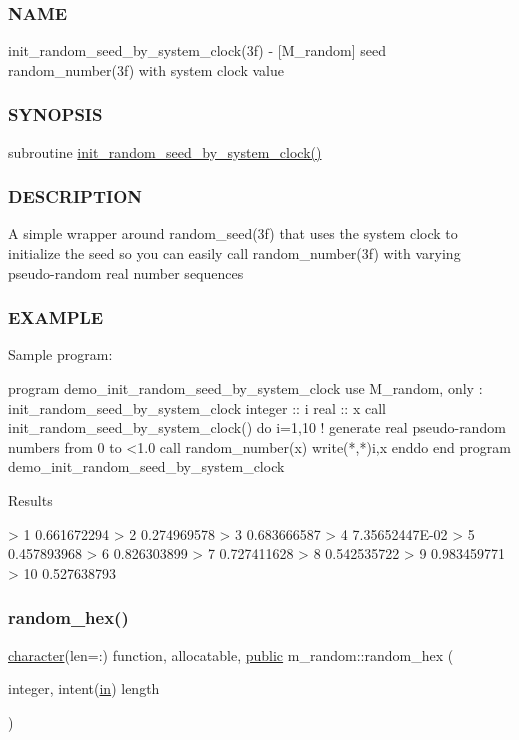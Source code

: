\subsubsection*{N\+A\+ME}

init\+\_\+random\+\_\+seed\+\_\+by\+\_\+system\+\_\+clock(3f) -\/ \mbox{[}M\+\_\+random\mbox{]} seed random\+\_\+number(3f) with system clock value \subsubsection*{S\+Y\+N\+O\+P\+S\+IS}

subroutine \hyperlink{namespacem__random_a887216bea7a75b314e538afd3ebe2ff3}{init\+\_\+random\+\_\+seed\+\_\+by\+\_\+system\+\_\+clock()} \subsubsection*{D\+E\+S\+C\+R\+I\+P\+T\+I\+ON}

A simple wrapper around random\+\_\+seed(3f) that uses the system clock to initialize the seed so you can easily call random\+\_\+number(3f) with varying pseudo-\/random real number sequences \subsubsection*{E\+X\+A\+M\+P\+LE}

\begin{DoxyVerb}Sample program:

 program demo_init_random_seed_by_system_clock
 use M_random, only : init_random_seed_by_system_clock
 integer :: i
 real    :: x
    call init_random_seed_by_system_clock()
    do i=1,10
       ! generate real pseudo-random numbers from 0 to <1.0
       call random_number(x)
       write(*,*)i,x
    enddo
 end program demo_init_random_seed_by_system_clock

Results

 >   1  0.661672294
 >   2  0.274969578
 >   3  0.683666587
 >   4   7.35652447E-02
 >   5  0.457893968
 >   6  0.826303899
 >   7  0.727411628
 >   8  0.542535722
 >   9  0.983459771
 >  10  0.527638793 \end{DoxyVerb}
 \mbox{\label{namespacem__random_a2fa2c1b1bcef16ff3be995981738cec0}} 
\subsubsection{\texorpdfstring{random\+\_\+hex()}{random\_hex()}}
{\footnotesize\ttfamily \hyperlink{option__stopwatch_83_8txt_abd4b21fbbd175834027b5224bfe97e66}{character}(len=\+:) function, allocatable, \hyperlink{M__stopwatch_83_8txt_a2f74811300c361e53b430611a7d1769f}{public} m\+\_\+random\+::random\+\_\+hex (\begin{DoxyParamCaption}\item[{integer, intent(\hyperlink{M__journal_83_8txt_afce72651d1eed785a2132bee863b2f38}{in})}]{length }\end{DoxyParamCaption})}



